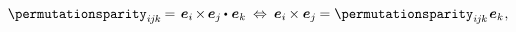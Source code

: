 \nopagebreak\vspace{-0.3em}\begin{equation*}
\permutationsparity_{i\hspace{-0.1ex}j\hspace{-0.1ex}k} \hspace{-0.15ex} = \hspace{.15ex}
\hspace{.1ex} \bm{e}_i \hspace{-0.2ex} \times \hspace{-0.2ex} \bm{e}_j \hspace{-0.1ex} \dotp \hspace{.12ex} \bm{e}_k
\:\Leftrightarrow\:
\bm{e}_i \hspace{-0.1ex} \times \bm{e}_j \hspace{-0.12ex}
= \permutationsparity_{i\hspace{-0.1ex}j\hspace{-0.1ex}k} \hspace{.2ex} \bm{e}_k
\hspace{.1ex} ,
\end{equation*}\vspace{-1.6em}

